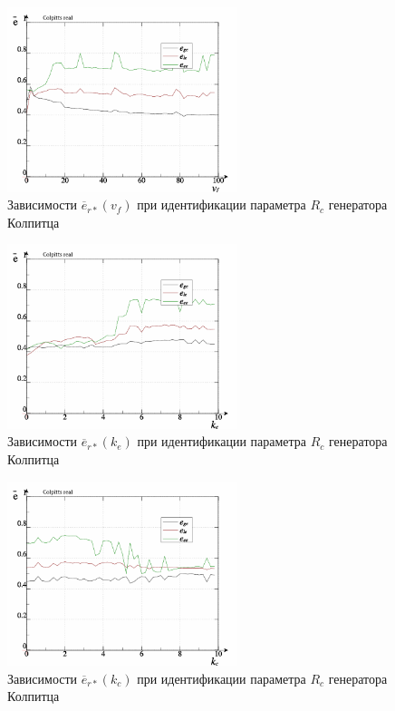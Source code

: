 \begin{figure}[htb!]
  \centerline{\includegraphics[width=0.6\textwidth]{p/colp_real_id_qi_fv5_prm_0-p_v_f.png} }
  \caption{Зависимости $\overline{e}_{r*}(v_f)$ при идентификации параметра $R_c$ генератора Колпитца}
  \label{atu:f:colp_real_id_qi_fv5_prm_0-p_v_f}
\end{figure}


\begin{figure}[htb!]
  \centerline{\includegraphics[width=0.6\textwidth]{p/colp_real_id_qi_fv5_prm_0-p_k_e.png} }
  \caption{Зависимости $\overline{e}_{r*}(k_e)$ при идентификации параметра $R_c$ генератора Колпитца}
  \label{atu:f:colp_real_id_qi_fv5_prm_0-p_k_e}
\end{figure}


\begin{figure}[htb!]
  \centerline{\includegraphics[width=0.6\textwidth]{p/colp_real_id_qi_fv5_prm_0-p_k_cl.png} }
  \caption{Зависимости $\overline{e}_{r*}(k_c)$ при идентификации параметра $R_c$ генератора Колпитца}
  \label{atu:f:colp_real_id_qi_fv5_prm_0-p_k_cl}
\end{figure}


